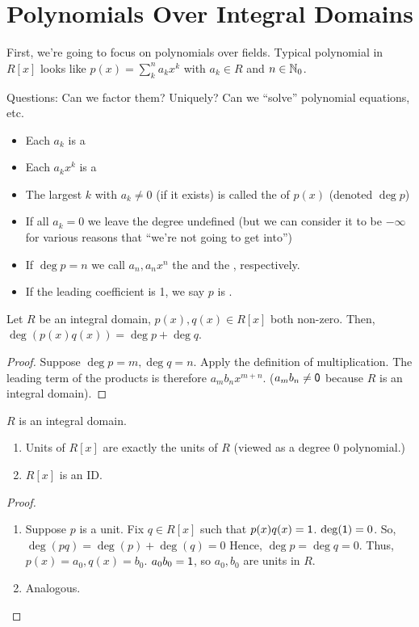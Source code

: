 \documentclass[notes.tex]{subfiles}
\begin{document}
\section*{Polynomials Over Integral Domains}
First, we're going to focus on polynomials over fields.
Typical polynomial in $R[x]$ looks like $p(x) = \sum_k^na_kx^k$ with $a_k\in R$ and $n\in \mathbb{N}_0$.

Questions: Can we factor them? Uniquely? Can we ``solve'' polynomial equations, etc.

\begin{defn}\leavevmode
	\begin{itemize}
		\item Each $a_k$ is a 
		\item Each $a_kx^k$ is a 
		\item The largest $k$ with $a_k\ne0$ (if it exists) is called the  of $p(x)$ (denoted $\deg p$)
		\item If all $a_k = 0$ we leave the degree undefined (but we can consider it to be $-\infty$ for various reasons that ``we're not going to get into'')
		\item If $\deg p = n$ we call $a_n, a_nx^n$ the  and the , respectively.
		\item If the leading coefficient is 1, we say $p$ is .
	\end{itemize}
\end{defn}

\begin{proposition}
	Let $R$ be an integral domain, $p(x), q(x)\in R[x]$ both non-zero. Then, $\deg(p(x)q(x)) = \deg p + \deg q$.
\end{proposition}
\begin{proof}
	Suppose $\deg p = m, \deg q = n$. Apply the definition of multiplication.
	The leading term of the products is therefore $a_mb_nx^{m+n}$. ($a_mb_n\ne \mathsf{0}$ because $R$ is an integral domain).
\end{proof}

\begin{corollary}
	$R$ is an integral domain.
	\begin{enumerate}
		\item Units of $R[x]$ are exactly the units of $R$ (viewed as a degree 0 polynomial.)
		\item $R[x]$ is an ID.
	\end{enumerate}
\end{corollary}
\begin{proof}\leavevmode
	\begin{enumerate}
		\item Suppose $p$ is a unit. Fix $q\in R[x]$ such that $p(x)q(x) = \mathsf{1}$. $\deg(\mathsf{1}) = 0$. So, $\deg(pq) = \deg(p) + \deg(q) = 0$
		Hence, $\deg p = \deg q = 0.$ Thus, $p(x) = a_0, q(x) = b_0$. $a_0b_0 = \mathsf{1}$, so $a_0, b_0$ are units in $R$.
		\item Analogous.
	\end{enumerate}
\end{proof}
\end{document}
